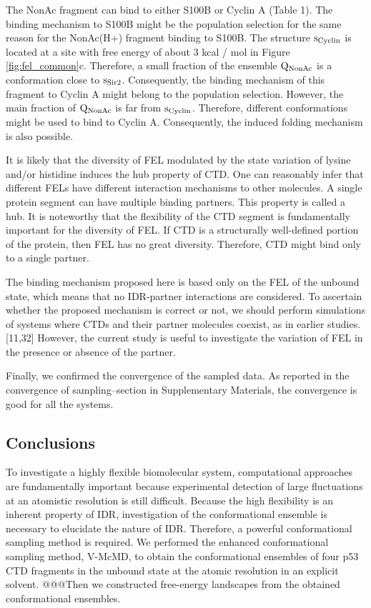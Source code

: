 The NonAc fragment can bind to either S100B or Cyclin A (Table 1). The binding mechanism to S100B might be the population selection for the same reason for the NonAc(H+) fragment binding to S100B. 
The structure $\rm s_{Cyclin}$ is located at a site with free energy of about 3 kcal / mol in Figure \ref{fig:fel_common}c. 
Therefore, a small fraction of the ensemble $\rm Q_{NonAc}$ is a conformation close to $\rm s_{Sir2}$. Consequently, the binding mechanism of this fragment to Cyclin A might belong to the population selection. However, the main fraction of $\rm Q_{NonAc}$ is far from $\rm s_{Cyclin}$. Therefore, different conformations might be used to bind to Cyclin A. Consequently, the induced folding mechanism is also possible.

It is likely that the diversity of FEL modulated by the state variation of lysine and/or histidine induces the hub property of CTD. One can reasonably infer that different FELs have different interaction mechanisms to other molecules. A single protein segment can have multiple binding partners. This property is called a hub. It is noteworthy that the flexibility of the CTD segment is fundamentally important for the diversity of FEL. If CTD is a structurally well-defined portion of the protein, then FEL has no great diversity. Therefore, CTD might bind only to a single partner.

The binding mechanism proposed here is based only on the FEL of the unbound state, which means that no IDR-partner interactions are considered. 
To ascertain whether the proposed mechanism is correct or not, we should perform simulations of systems where CTDs and their partner molecules coexist, as in earlier studies.[11,32] 
However, the current study is useful to investigate the variation of FEL in the presence or absence of the partner.

Finally, we confirmed the convergence of the sampled data. As reported in the convergence of sampling–section in Supplementary Materials, the convergence is good for all the systems.

\subsection{Conclusions}
To investigate a highly flexible biomolecular system, computational approaches are fundamentally important because experimental detection of large fluctuations at an atomistic resolution is still difficult. 
Because the high flexibility is an inherent property of IDR, investigation of the conformational ensemble is necessary to elucidate the nature of IDR. 
Therefore, a powerful conformational sampling method is required. 
We performed the enhanced conformational sampling method, V-McMD, to obtain the conformational ensembles of four p53 CTD fragments in the unbound state at the atomic resolution in an explicit solvent. 
@@@Then we constructed free-energy landscapes from the obtained conformational ensembles.

